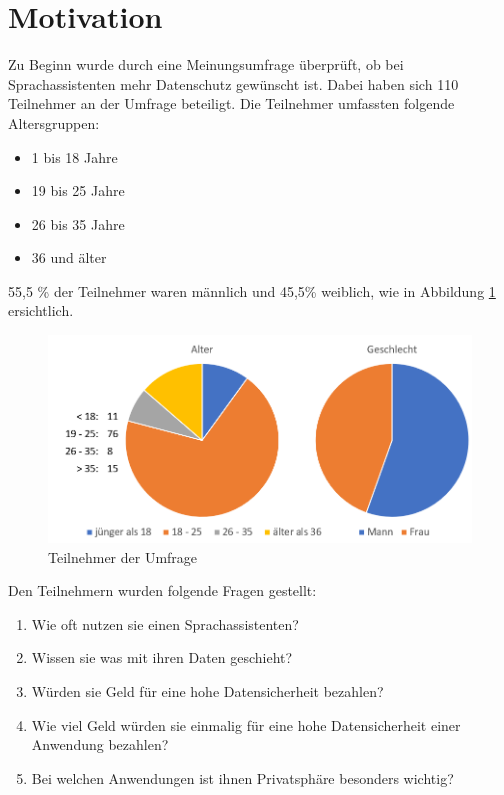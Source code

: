 \section{Motivation}\label{sec:motivaiton}
Zu Beginn wurde durch eine Meinungsumfrage überprüft, ob bei Sprachassistenten mehr Datenschutz gewünscht ist. Dabei haben sich 110 Teilnehmer an der Umfrage beteiligt. Die Teilnehmer umfassten folgende Altersgruppen:
\begin{itemize}
	\item 1 bis 18 Jahre 
	\item 19 bis 25 Jahre
	\item 26 bis 35 Jahre
	\item 36 und älter	
\end{itemize}

55,5 \% der Teilnehmer waren männlich und 45,5\%  weiblich, wie in Abbildung \ref{fig:umfrage_teilnehmer} ersichtlich.

\begin{figure}[!h]
	\centering
	\includegraphics[width=0.9\linewidth]{Picture/umfrage_teilnehmer}
	\caption[Teilnehmer der Umfrage]{Teilnehmer der Umfrage}
	\label{fig:umfrage_teilnehmer}
	
\end{figure}

Den Teilnehmern wurden folgende Fragen gestellt:

\begin{enumerate}	
	\item Wie oft nutzen sie einen Sprachassistenten?
	\item Wissen sie was mit ihren Daten geschieht?
	\item Würden sie Geld für eine hohe Datensicherheit bezahlen?
	\item Wie viel Geld würden sie einmalig für eine hohe Datensicherheit einer Anwendung bezahlen?
	\item Bei welchen Anwendungen ist ihnen Privatsphäre besonders wichtig?	
\end{enumerate}

